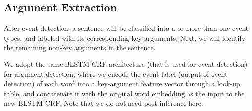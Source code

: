 \subsection{Argument Extraction}
After event detection, a sentence will be classified into a or more than one event types, and labeled with its corresponding key arguments.
Next, we will identify the remaining non-key arguments in the sentence.

We adopt the same BLSTM-CRF architecture (that is used for event detection) for argument detection, where we encode the event label (output
of event detection) of each word into a key-argument feature vector through a look-up table, and concatenate it with the original word
embedding as the input to the new BLSTM-CRF. Note that we do not need post inference here.
